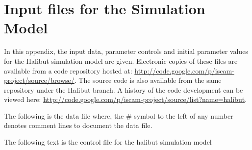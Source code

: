 

\section{Input files for the Simulation Model} \label{appen:dataFiles}

In this appendix, the input data, parameter controls and initial parameter values for the Halibut simulation model are given.  Electronic copies of these files are available from a code repository hosted at: \url{http://code.google.com/p/iscam-project/source/browse/}.  The source code is also available from the same repository under the Halibut branch.  A history of the code development can be viewed here: \url{http://code.google.com/p/iscam-project/source/list?name=halibut}.


The following is the data file where, the \# symbol to the left of any number denotes comment lines to document the data file.


\tiny
\begin{alltt}

\end{alltt}
\normalsize


The following text is the control file for the halibut simulation model
\tiny
\begin{alltt}

\end{alltt}
\normalsize


\tiny
\begin{alltt}

\end{alltt}
\normalsize
